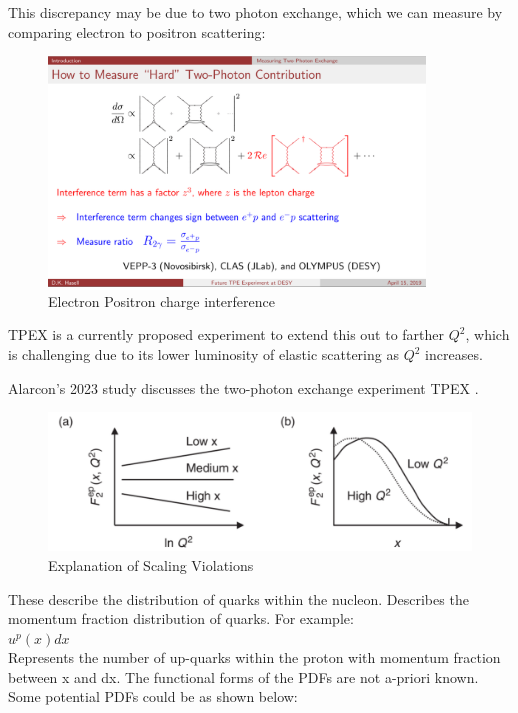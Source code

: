             This discrepancy may be due to two photon exchange, which we can measure by comparing electron to positron scattering:
            
                  
            \begin{figure}[H]
                \centering
                \includegraphics[width=10cm]{Chapters/Ch1-Intro/Ch1-Sec1-Background/pics/elastic-ep/tpex.PNG}
                \caption{Electron Positron charge interference}
            \end{figure}
        
        
            TPEX is a currently proposed experiment to extend this out to farther $Q^2$, which is challenging due to its lower luminosity of elastic scattering as $Q^2$ increases.    

            Alarcon's 2023 study discusses the two-photon exchange experiment TPEX \parencite{Alarcon2023Two-PhotonTPEX}.

\fi




   \iffalse


           \begin{figure}[H]
            \centering
            \includegraphics[width=12cm]{Chapters/Ch1-Intro/Ch1-Sec1-Background/pics/inelastic-ep/scaling-violations.PNG}
            \caption{Explanation of Scaling Violations}
        \end{figure}
        


        \indent These describe the distribution of quarks within the nucleon. Describes the momentum fraction distribution of quarks. For example:\\
        \newline
        $u^p(x)dx$\\
        \newline
        Represents the number of up-quarks within the proton with momentum fraction between x and dx. The functional forms of the PDFs are not a-priori known. Some potential PDFs could be as shown below:\\

